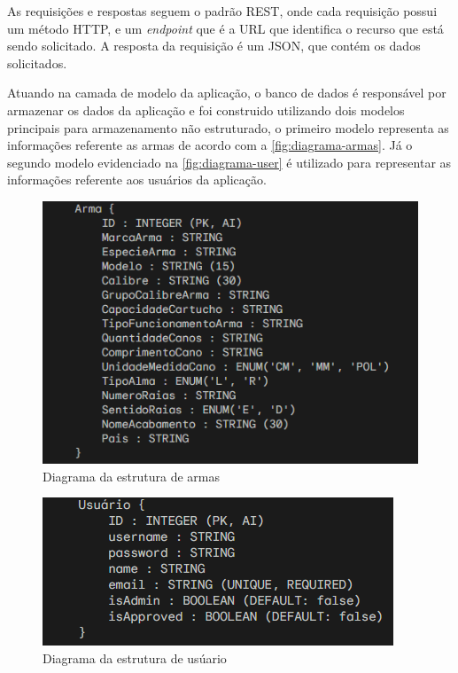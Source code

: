 As requisições e respostas seguem o padrão REST, onde cada requisição possui um método HTTP, e um \textit{endpoint} que é a URL que identifica o recurso que está sendo solicitado. A resposta da requisição é um JSON, que contém os dados solicitados.

Atuando na camada de modelo da aplicação, o banco de dados é responsável por armazenar os dados da aplicação e foi construido utilizando dois modelos principais para armazenamento não estruturado, o primeiro modelo  representa as informações referente as armas de acordo com a \autoref{fig:diagrama-armas}.
Já o segundo modelo evidenciado na \autoref{fig:diagrama-user} é utilizado para representar as informações referente aos usuários da aplicação.

\begin{figure}[htb]
    \caption{\label{fig:diagrama-armas}Diagrama da estrutura de armas}
    \begin{center}
        \includegraphics[scale=0.82]{imagens/diagramaArma.png}
    \end{center}
\end{figure}

\begin{figure}[htb]
    \caption{\label{fig:diagrama-user}Diagrama da estrutura de usúario}
    \begin{center}
        \includegraphics[scale=1]{imagens/diagramaUser.png}
    \end{center}
\end{figure}





